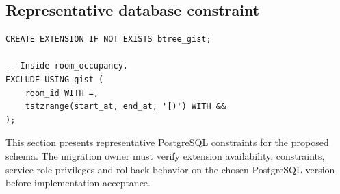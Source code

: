 \subsection{Representative database constraint}

\begingroup
\small
\begin{samepage}
\begin{verbatim}
CREATE EXTENSION IF NOT EXISTS btree_gist;

-- Inside room_occupancy.
EXCLUDE USING gist (
    room_id WITH =,
    tstzrange(start_at, end_at, '[)') WITH &&
);
\end{verbatim}
\end{samepage}
\endgroup

This section presents representative PostgreSQL constraints for the proposed schema. The migration owner must verify extension availability, constraints, service-role privileges and rollback behavior on the chosen PostgreSQL version before implementation acceptance.\par